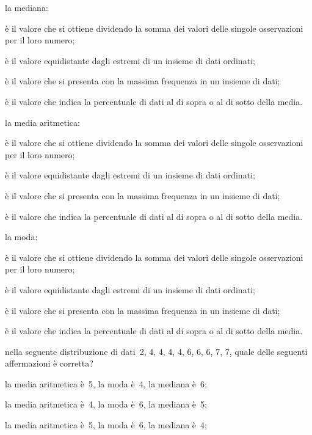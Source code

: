 \begin{esercizio}
\begin{enumerate*}
\item la mediana:
 \begin{enumeratea}
\item è il valore che si ottiene dividendo la somma dei valori delle singole osservazioni per il loro numero;
\item è il valore equidistante dagli estremi di un insieme di dati ordinati;
\item è il valore che si presenta con la massima frequenza in un insieme di dati;
\item è il valore che indica la percentuale di dati al di sopra o al di sotto della media.
 \end{enumeratea}
\item la media aritmetica:
 \begin{enumeratea}
 \item è il valore che si ottiene dividendo la somma dei valori delle singole osservazioni per il loro numero;
\item è il valore equidistante dagli estremi di un insieme di dati ordinati;
\item è il valore che si presenta con la massima frequenza in un insieme di dati;
\item è il valore che indica la percentuale di dati al di sopra o al di sotto della media.
 \end{enumeratea}
\item la moda:
 \begin{enumeratea}
\item è il valore che si ottiene dividendo la somma dei valori delle singole osservazioni per il loro numero;
\item è il valore equidistante dagli estremi di un insieme di dati ordinati;
\item è il valore che si presenta con la massima frequenza in un insieme di dati;
\item è il valore che indica la percentuale di dati al di sopra o al di sotto della media.
 \end{enumeratea}
\item nella seguente distribuzione di dati~2, 4, 4, 4, 4, 6, 6, 6, 7, 7, quale delle seguenti affermazioni è corretta?
 \begin{enumeratea}
\item la media aritmetica è~5, la moda è~4, la mediana è~6;
\item la media aritmetica è~4, la moda è~6, la mediana è~5;
\item la media aritmetica è~5, la moda è~6, la mediana è~4;

\end{enumeratea}
\end{enumerate*}
\end{esercizio}
